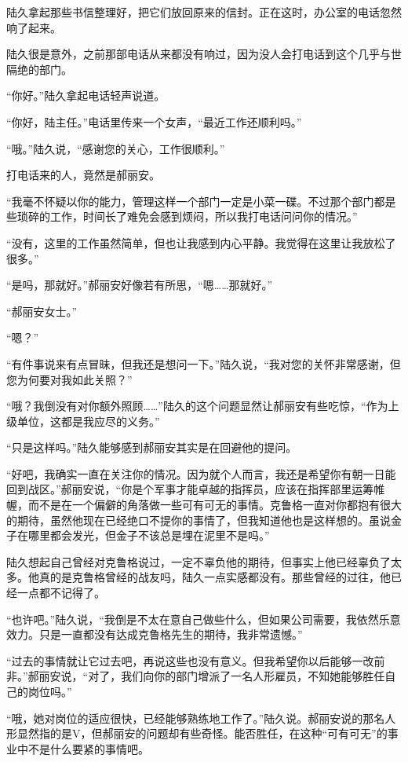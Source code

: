 陆久拿起那些书信整理好，把它们放回原来的信封。正在这时，办公室的电话忽然响了起来。

陆久很是意外，之前那部电话从来都没有响过，因为没人会打电话到这个几乎与世隔绝的部门。

“你好。”陆久拿起电话轻声说道。

“你好，陆主任。”电话里传来一个女声，“最近工作还顺利吗。”

“哦。”陆久说，“感谢您的关心，工作很顺利。”

打电话来的人，竟然是郝丽安。

“我毫不怀疑以你的能力，管理这样一个部门一定是小菜一碟。不过那个部门都是些琐碎的工作，时间长了难免会感到烦闷，所以我打电话问问你的情况。”

“没有，这里的工作虽然简单，但也让我感到内心平静。我觉得在这里让我放松了很多。”

“是吗，那就好。”郝丽安好像若有所思，“嗯……那就好。”

“郝丽安女士。”

“嗯？”

“有件事说来有点冒昧，但我还是想问一下。”陆久说，“我对您的关怀非常感谢，但您为何要对我如此关照？”

“哦？我倒没有对你额外照顾……”陆久的这个问题显然让郝丽安有些吃惊，“作为上级单位，这都是我应尽的义务。”

“只是这样吗。”陆久能够感到郝丽安其实是在回避他的提问。

“好吧，我确实一直在关注你的情况。因为就个人而言，我还是希望你有朝一日能回到战区。”郝丽安说，“你是个军事才能卓越的指挥员，应该在指挥部里运筹帷幄，而不是在一个偏僻的角落做一些可有可无的事情。克鲁格一直对你都抱有很大的期待，虽然他现在已经绝口不提你的事情了，但我知道他也是这样想的。虽说金子在哪里都会发光，但金子不该总是埋在泥里不是吗。”

陆久想起自己曾经对克鲁格说过，一定不辜负他的期待，但事实上他已经辜负了太多。他真的是克鲁格曾经的战友吗，陆久一点实感都没有。那些曾经的过往，他已经一点都不记得了。

“也许吧。”陆久说，“我倒是不太在意自己做些什么，但如果公司需要，我依然乐意效力。只是一直都没有达成克鲁格先生的期待，我非常遗憾。”

“过去的事情就让它过去吧，再说这些也没有意义。但我希望你以后能够一改前非。”郝丽安说，“对了，我们向你的部门增派了一名人形雇员，不知她能够胜任自己的岗位吗。”

“哦，她对岗位的适应很快，已经能够熟练地工作了。”陆久说。郝丽安说的那名人形显然指的是V，但郝丽安的问题却有些奇怪。能否胜任，在这种“可有可无”的事业中不是什么要紧的事情吧。

